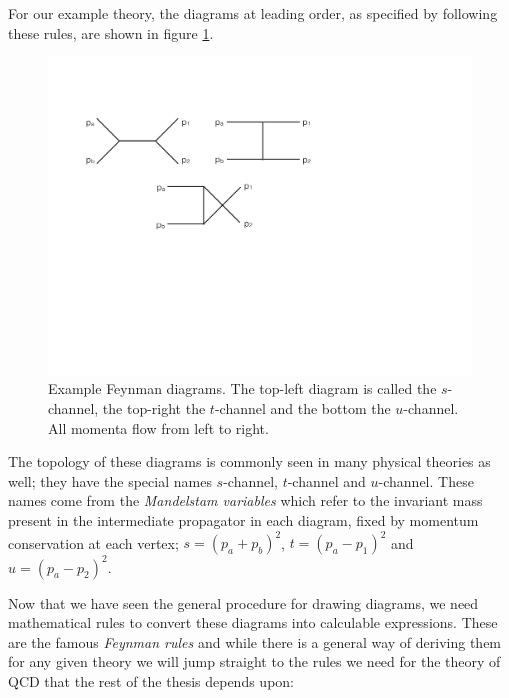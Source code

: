 For our example theory, the diagrams at leading order, as specified by following these rules, are shown in figure \ref{fig:feyndiags}.  

\begin{figure}[t]
\centering
\includegraphics[scale=0.6]{Images/feyndiags.pdf} 
\caption{Example Feynman diagrams. The top-left diagram is called the $s$-channel, the top-right the $t$-channel and the bottom the $u$-channel. All momenta flow from left to right.}
\label{fig:feyndiags}
\end{figure}

The topology of these diagrams is commonly seen in many physical theories as well; they have the special names $s$-channel, $t$-channel and $u$-channel. These names come from the \emph{Mandelstam variables} which refer to the invariant mass  present in the intermediate propagator in each diagram, fixed by momentum conservation at each vertex; $s = (p_a + p_b)^2$, $t = (p_a - p_1)^2$ and $u = (p_a - p_2)^2$. 

Now that we have seen the general procedure for drawing diagrams, we need mathematical rules to convert these diagrams into calculable expressions. These are the famous \emph{Feynman rules} and while there is a general way of deriving them for any given theory we will jump straight to the rules we need for the theory of QCD that the rest of the thesis depends upon: 

